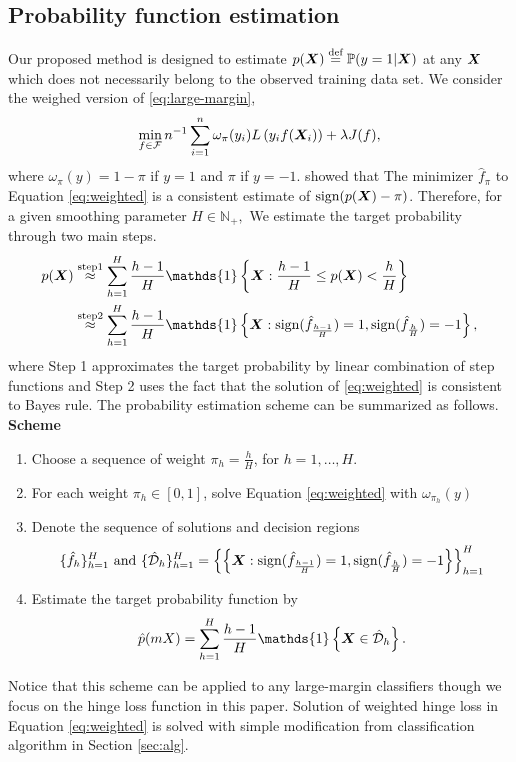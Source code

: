 \documentclass[12pt]{article}
\begin{document}
\subsection{Probability function estimation}
Our proposed method is designed to estimate $p(\bm X)\stackrel{\text{def}}{=}\mathbb{P}(y = 1|\bm X)$ at any $\bm X$ which does not necessarily belong to the observed training data set. We consider the weighed version of \eqref{eq:large-margin},
\begin{align}
\label{eq:weighted}
\min_{f\in\mathcal{F}}n^{-1}\sum_{i=1}^n \omega_{\pi}(y_i)L\left(y_if(\bm X_i)\right)+ \lambda J(f),
\end{align}
where $\omega_\pi(y) = 1-\pi $ if $y = 1$ and $\pi$ if $y = -1$.
\citet{wang2008probability} showed that The minimizer $\hat f_\pi$ to Equation \eqref{eq:weighted} is a consistent estimate of $\text{sign}(p(\bm X)-\pi)$. Therefore,  for a given smoothing parameter $H\in\mathbb{N}_+,$ We estimate the target probability through two main steps.
\begin{align}
\label{eq:approx}
p(\mX) &\stackrel{\text{step1}}{\approx} \sum_{h=1}^H\frac{h-1}{H}\mathds{1}\left\{\mX:\frac{h-1}{H}\leq p(\mX)<\frac{h}{H}\right\}\\&\stackrel{\text{step2}}{\approx} \sum_{h=1}^H\frac{h-1}{H}\mathds{1}\left\{\mX:\text{sign}(\hat f_{\frac{h-1}{H}}) = 1, \text{sign}(\hat f_{\frac{h}{H}}) = -1\right\},
\end{align}
where Step 1 approximates the target probability by linear combination of step functions and Step 2 uses the fact that the solution of \eqref{eq:weighted} is consistent to Bayes rule.
The probability estimation scheme can be summarized as follows.\\
{\bf Scheme}\vspace{-.4cm}
\begin{enumerate}[label={S.\arabic*}]
\item Choose a sequence of weight $\pi_h = \frac{h}{H}$, for $h = 1,\ldots, H$.
\item For each weight $\pi_h\in[0,1]$, solve Equation \eqref{eq:weighted} with $\omega_{\pi_h}(y)$
\item Denote the sequence of solutions and decision regions 
\begin{align}
\{\hat f_h\}_{h=1}^H \text{ and } \{\hat {\mathcal{D}}_h\}_{h=1}^H = \left\{\left\{\bm X:\text{sign}(\hat f_{\frac{h-1}{H}}) = 1, \text{sign}(\hat f_{\frac{h}{H}}) = -1\right\}\right\}_{h=1}^H
\end{align}
\item Estimate the target probability function by 
\begin{align}
\hat p(mX) = \sum_{h=1}^H\frac{h-1}{H}\mathds{1}\left\{\mX\in \hat \tD_h\right\}.
\end{align}
\end{enumerate}
Notice that this scheme can be applied to any large-margin classifiers though we  focus on the hinge loss function in this paper. Solution of weighted hinge loss in Equation \eqref{eq:weighted} is solved with simple modification from classification algorithm in Section \ref{sec:alg}.
\end{document}
